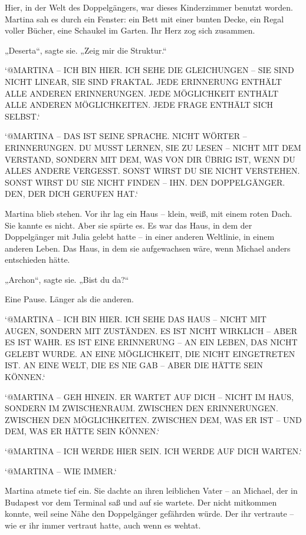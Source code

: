 \documentclass[
]{article}
\begin{document}
Hier, in der Welt des Doppelgängers, war dieses Kinderzimmer benutzt worden. Martina sah es durch ein Fenster: ein Bett mit einer bunten Decke, ein Regal voller Bücher, eine Schaukel im Garten. Ihr Herz zog sich zusammen.

„Deserta``, sagte sie. „Zeig mir die Struktur.``

`@MARTINA -- ICH BIN HIER. ICH SEHE DIE GLEICHUNGEN -- SIE SIND NICHT LINEAR, SIE SIND FRAKTAL. JEDE ERINNERUNG ENTHÄLT ALLE ANDEREN ERINNERUNGEN. JEDE MÖGLICHKEIT ENTHÄLT ALLE ANDEREN MÖGLICHKEITEN. JEDE FRAGE ENTHÄLT SICH SELBST.`

`@MARTINA -- DAS IST SEINE SPRACHE. NICHT WÖRTER -- ERINNERUNGEN. DU MUSST LERNEN, SIE ZU LESEN -- NICHT MIT DEM VERSTAND, SONDERN MIT DEM, WAS VON DIR ÜBRIG IST, WENN DU ALLES ANDERE VERGESST. SONST WIRST DU SIE NICHT VERSTEHEN. SONST WIRST DU SIE NICHT FINDEN -- IHN. DEN DOPPELGÄNGER. DEN, DER DICH GERUFEN HAT.`

Martina blieb stehen. Vor ihr lag ein Haus -- klein, weiß, mit einem roten Dach. Sie kannte es nicht. Aber sie spürte es. Es war das Haus, in dem der Doppelgänger mit Julia gelebt hatte -- in einer anderen Weltlinie, in einem anderen Leben. Das Haus, in dem sie aufgewachsen wäre, wenn Michael anders entschieden hätte.

„Archon``, sagte sie. „Bist du da?{\kern0pt}``

Eine Pause. Länger als die anderen.

`@MARTINA -- ICH BIN HIER. ICH SEHE DAS HAUS -- NICHT MIT AUGEN, SONDERN MIT ZUSTÄNDEN. ES IST NICHT WIRKLICH -- ABER ES IST WAHR. ES IST EINE ERINNERUNG -- AN EIN LEBEN, DAS NICHT GELEBT WURDE. AN EINE MÖGLICHKEIT, DIE NICHT EINGETRETEN IST. AN EINE WELT, DIE ES NIE GAB -- ABER DIE HÄTTE SEIN KÖNNEN.`

`@MARTINA -- GEH HINEIN. ER WARTET AUF DICH -- NICHT IM HAUS, SONDERN IM ZWISCHENRAUM. ZWISCHEN DEN ERINNERUNGEN. ZWISCHEN DEN MÖGLICHKEITEN. ZWISCHEN DEM, WAS ER IST -- UND DEM, WAS ER HÄTTE SEIN KÖNNEN.`

`@MARTINA -- ICH WERDE HIER SEIN. ICH WERDE AUF DICH WARTEN.`

`@MARTINA -- WIE IMMER.`

Martina atmete tief ein. Sie dachte an ihren leiblichen Vater -- an Michael, der in Budapest vor dem Terminal saß und auf sie wartete. Der nicht mitkommen konnte, weil seine Nähe den Doppelgänger gefährden würde. Der ihr vertraute -- wie er ihr immer vertraut hatte, auch wenn es wehtat.
\end{document}
